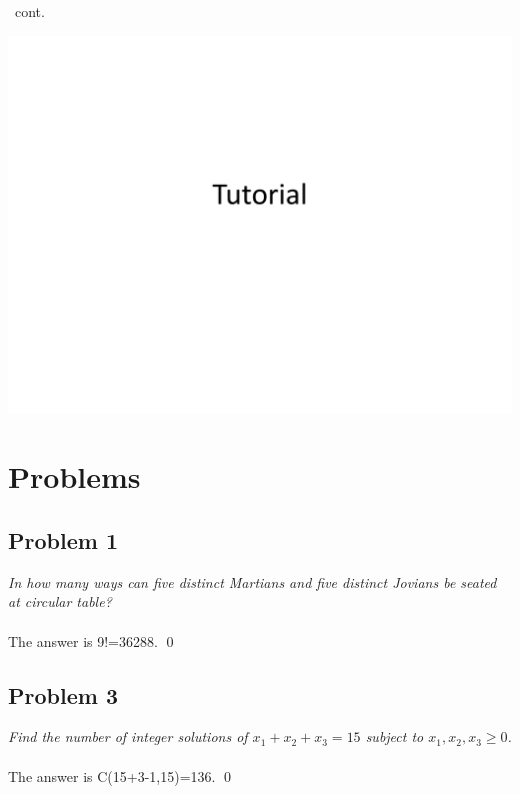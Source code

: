 \documentclass[
        handout,
        ]{beamer}
\begin{document}
    \begin{frame}[c,shrink]{\secname\ cont.}
        \centerline{\includegraphics[height=0.85\textheight,page=4]{tut_probability}}
    \end{frame}
    
    
    
\section{Problems}
    \subsection{Problem 1}    
        \begin{frame}[c]{\subsecname}
            \emph{In how many ways can five distinct Martians and five distinct Jovians be seated at circular table?}\\$\;$\\\pause
            The answer is 9!=36288. \qed
        \end{frame}



    \subsection{Problem 3}
        \begin{frame}[c]{\subsecname}
            \emph{Find the number of integer solutions of $x_1 + x_2 + x_3 = 15$ subject to $ x_1, x_2, x_3 \geq 0$.}\\$\;$\\\pause
            The answer is C(15+3-1,15)=136. \qed
        \end{frame}
\end{document}
